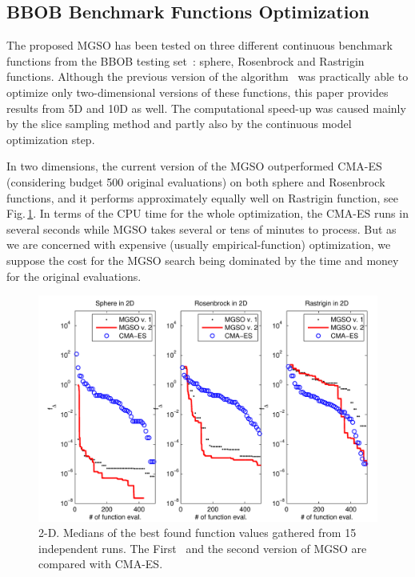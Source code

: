 \documentclass{itatnew}
\begin{document}
\subsection{BBOB Benchmark Functions Optimization}

The proposed MGSO has been tested on three different continuous benchmark functions from the BBOB testing set~\cite{hansen_real_2009}: sphere, Rosenbrock and Rastrigin functions. Although the previous version of the algorithm~\cite{bajer_model_2013} was practically able to optimize only two-dimensional versions of these functions, this paper provides results from 5D and 10D as well. The computational speed-up was caused mainly by the slice sampling method and partly also by the continuous model optimization step. %

In two dimensions, the current version of the MGSO outperformed CMA-ES (considering budget 500 original evaluations) on both sphere and Rosenbrock functions, and it performs approximately equally well on Rastrigin function, see Fig.\,\ref{fig:optim_2D}. In terms of the CPU time for the whole optimization, the CMA-ES runs in several seconds while MGSO takes several or tens of minutes to process. But as we are concerned with expensive (usually empirical-function) optimization, we suppose the cost for the MGSO search being dominated by the time and money for the original evaluations.


\begin{figure}
  \centering
  \includegraphics[width=\linewidth]{optim_2D_color}
  {\small
    \caption{2-D. Medians of the best found function values gathered from 15 independent runs. The First~\cite{bajer_model_2013} and the second version of MGSO are compared with CMA-ES.
  \label{fig:optim_2D}
  }
  }
\end{figure}
\end{document}
